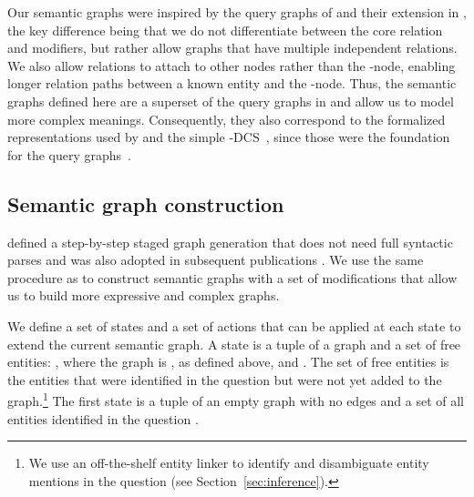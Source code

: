 \documentclass[11pt]{article}
\begin{document}
\begin{figure}[t]
\begin{minipage}{0.57\linewidth}
\begin{center}
    \end{center}
  \end{minipage}
\end{figure}

Our semantic graphs were inspired by the query graphs of  and their extension in  , the key difference being that we do not differentiate between the core relation and modifiers, but rather allow graphs that have multiple independent relations. We also allow relations to attach to other nodes rather than the -node, enabling longer relation paths between a known entity and the -node. Thus, the semantic graphs defined here are a superset of the query graphs in  and allow us to model more complex meanings.
Consequently, they also correspond to the formalized representations used by  and the simple -DCS~\cite{Berant2013}, since those were the foundation for the query graphs~\cite{Yih2015}.


\subsection{Semantic graph construction}
\label{sec:graph-construction}

 defined a step-by-step staged graph generation that does not need full syntactic parses and was also adopted in subsequent publications \cite{Bao2016,Peng2017}. We use the same procedure as  to construct semantic graphs with a set of modifications that allow us to build more expressive and complex graphs.

We define a set of states and a set of actions that can be applied at each state to extend the current semantic graph. A state is a tuple of a graph and a set of free entities: , where the graph is , as defined above, and . The set of free entities  is the entities that were identified in the question but were not yet added to the graph.\footnote{We use an off-the-shelf entity linker to identify and disambiguate entity mentions in the question (see Section~\ref{sec:inference}).} The first state is a tuple of an empty graph with no edges and a set of all entities identified in the question .
\end{document}
